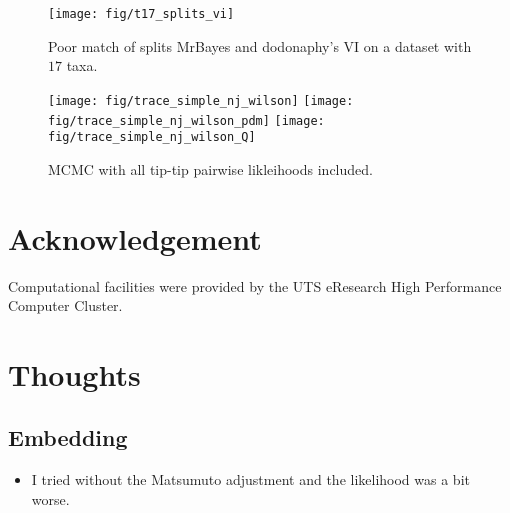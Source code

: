 \documentclass[11pt, twocolumn]{article}
\begin{document}
\begin{figure}[htbp] \label{fig:splits_vi}
\begin{center}
    \texttt{[image: fig/t17\_splits\_vi]}
\end{center}
\caption{Poor match of splits MrBayes and dodonaphy's VI on a dataset with $17$ taxa.}
\end{figure}


\begin{figure}[htbp] \label{fig:wilson_mcmc}
    \begin{center}
        \texttt{[image: fig/trace\_simple\_nj\_wilson]}
        \texttt{[image: fig/trace\_simple\_nj\_wilson\_pdm]}
        \texttt{[image: fig/trace\_simple\_nj\_wilson\_Q]}
    \end{center}
    \caption{MCMC with all tip-tip pairwise likleihoods included.}
\end{figure}



	
\section{Acknowledgement}
Computational facilities were provided by the UTS eResearch High Performance Computer Cluster.

\nocite{*}



\clearpage
\section{Thoughts}
\subsection{Embedding}
\begin{itemize}
\item I tried without the Matsumuto adjustment and the likelihood was a bit worse.
\end{itemize}
\end{document}
